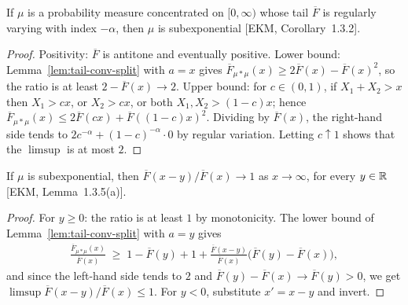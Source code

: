 \begin{theorem}
  \label{thm:subexp-of-rv}
  \leanok
  If $\mu$ is a probability measure concentrated on $[0, \infty)$ whose tail $\overline{F}$ is
  regularly varying with index $-\alpha$, then $\mu$ is subexponential [EKM, Corollary~1.3.2].
\end{theorem}
\begin{proof}
  \leanok
  Positivity: $\overline{F}$ is antitone and eventually positive.
  Lower bound: Lemma~\ref{lem:tail-conv-split} with $a = x$ gives
  $\overline{F}_{\mu*\mu}(x) \ge 2 \overline{F}(x) - \overline{F}(x)^2$, so the ratio is at least
  $2 - \overline{F}(x) \to 2$.
  Upper bound: for $c \in (0,1)$, if $X_1 + X_2 > x$ then $X_1 > cx$, or $X_2 > cx$, or both
  $X_1, X_2 > (1-c)x$; hence
  $\overline{F}_{\mu*\mu}(x) \le 2 \overline{F}(cx) + \overline{F}((1-c)x)^2$. Dividing by
  $\overline{F}(x)$, the right-hand side tends to $2 c^{-\alpha} + (1-c)^{-\alpha} \cdot 0$ by
  regular variation. Letting $c \uparrow 1$ shows that the $\limsup$ is at most $2$.
\end{proof}

\begin{theorem}
  \label{thm:subexp-long-tailed}
  \leanok
  If $\mu$ is subexponential, then $\overline{F}(x - y)/\overline{F}(x) \to 1$ as $x \to \infty$,
  for every $y \in \mathbb{R}$ [EKM, Lemma~1.3.5(a)].
\end{theorem}
\begin{proof}
  \leanok
  For $y \ge 0$: the ratio is at least $1$ by monotonicity. The lower bound of
  Lemma~\ref{lem:tail-conv-split} with $a = y$ gives
  \begin{align*}
    \frac{\overline{F}_{\mu*\mu}(x)}{\overline{F}(x)} \; \ge \; 1 - \overline{F}(y) + 1
      + \frac{\overline{F}(x - y)}{\overline{F}(x)} \big( \overline{F}(y) - \overline{F}(x) \big) ,
  \end{align*}
  and since the left-hand side tends to $2$ and $\overline{F}(y) - \overline{F}(x) \to \overline{F}(y) > 0$,
  we get $\limsup \overline{F}(x-y)/\overline{F}(x) \le 1$. For $y < 0$, substitute $x' = x - y$
  and invert.
\end{proof}

